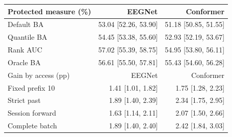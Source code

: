 \begin{tabular}{@{}lrr@{}}\toprule
Protected measure (\%) & EEGNet & Conformer \\\midrule
Default BA & 53.04 [52.26, 53.90] & 51.18 [50.85, 51.55] \\
Quantile BA & 54.45 [53.38, 55.60] & 52.93 [52.19, 53.67] \\
Rank AUC & 57.02 [55.39, 58.75] & 54.95 [53.80, 56.11] \\
Oracle BA & 56.61 [55.50, 57.81] & 55.43 [54.60, 56.28] \\
\midrule Gain by access (pp) & EEGNet & Conformer \\\midrule
Fixed prefix 10 & 1.41 [1.01, 1.82] & 1.75 [1.28, 2.23] \\
Strict past & 1.89 [1.40, 2.39] & 2.34 [1.75, 2.95] \\
Session forward & 1.63 [1.14, 2.11] & 2.07 [1.50, 2.66] \\
Complete batch & 1.89 [1.40, 2.40] & 2.42 [1.84, 3.03] \\
\bottomrule\end{tabular}
